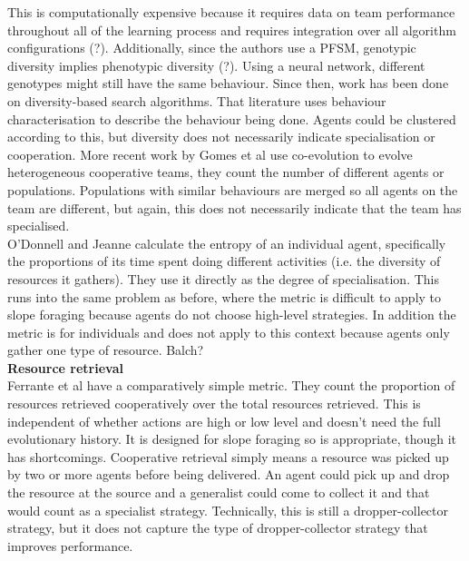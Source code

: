 \documentclass[12pt]{article}
\begin{document}
This is computationally expensive because it requires data on team performance throughout all of the learning process and requires integration over all algorithm configurations (?). Additionally, since the authors use a PFSM, genotypic diversity implies phenotypic diversity (?). Using a neural network, different genotypes might still have the same behaviour. Since then, work has been done on diversity-based search algorithms. That literature uses behaviour characterisation to describe the behaviour being done. Agents could be clustered according to this, but diversity does not necessarily indicate specialisation or cooperation. More recent work by Gomes et al \cite{gomes:IEEETR:2017} use co-evolution to evolve heterogeneous cooperative teams, they count the number of different agents or populations. Populations with similar behaviours are merged so all agents on the team are different, but again, this does not necessarily indicate that the team has specialised.  \\

O'Donnell and Jeanne \cite{odonnell:BES:1990} calculate the entropy of an individual agent, specifically the proportions of its time spent doing different activities (i.e. the diversity of resources it gathers). They use it directly as the degree of specialisation. This runs into the same problem as before, where the metric is difficult to apply to slope foraging because agents do not choose high-level strategies. In addition the metric is for individuals and does not apply to this context because agents only gather one type of resource. Balch?\\

\textbf{Resource retrieval}\\

Ferrante et al \cite{ferrante:PLoSCB:2015} have a comparatively simple metric. They count the proportion of resources retrieved cooperatively over the total resources retrieved. This is independent of whether actions are high or low level and doesn't need the full evolutionary history. It is designed for slope foraging so is appropriate, though it has shortcomings.  Cooperative retrieval simply means a resource was picked up by two or more agents before being delivered. An agent could pick up and drop the resource at the source and a generalist could come to collect it and that would count as a specialist strategy. Technically, this is still a dropper-collector strategy, but it does not capture the type of dropper-collector strategy that improves performance.\\
\end{document}
